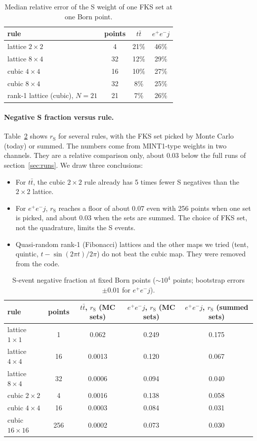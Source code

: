\documentclass[11pt,a4paper]{article}
\newcommand{\rS}{r_{\mathrm S}}
\begin{document}
\begin{table}[t]
\centering
\begin{tabular}{lccc}
\toprule
rule & points & $t\bar t$ & $e^+e^-j$\\
\midrule
lattice $2\times2$ & 4  & 21\% & 46\% \\
lattice $8\times4$ & 32 & 12\% & 29\% \\
cubic $4\times4$   & 16 & 10\% & 27\% \\
cubic $8\times4$   & 32 & 8\%  & 25\% \\
rank-1 lattice (cubic), $N=21$ & 21 & 7\% & 26\% \\
\bottomrule
\end{tabular}
\caption{Median relative error of the S weight of one FKS set at one Born point.}
\label{tab:fixedset}
\end{table}

\paragraph{Negative S fraction versus rule.}
Table~\ref{tab:dumpr} shows $\rS$ for several rules, with the FKS set picked by Monte Carlo
(today) or summed. The numbers come from MINT1-type weights in two channels. They
are a relative comparison only, about $0.03$ below the full runs of
section~\ref{sec:runs}. We draw three conclusions:
\begin{itemize}
\item For $t\bar t$, the cubic $2\times2$ rule already has 5 times fewer S negatives than the
$2\times2$ lattice.
\item For $e^+e^-j$, $\rS$ reaches a floor of about $0.07$ even with 256 points when one set
is picked, and about $0.03$ when the sets are summed. The choice of FKS set, not the
quadrature, limits the S events.
\item Quasi-random rank-1 (Fibonacci) lattices and the other maps we tried (tent, quintic,
$t-\sin(2\pi t)/2\pi$) do not beat the cubic map. They were removed from the code.
\end{itemize}

\begin{table}[t]
\centering
\begin{tabular}{lcccc}
\toprule
rule & points & $t\bar t$, $\rS$ (MC sets) & $e^+e^-j$, $\rS$ (MC sets) & $e^+e^-j$, $\rS$ (summed sets)\\
\midrule
lattice $1\times1$ & 1 & 0.062 & 0.249 & 0.175 \\
lattice $4\times4$ & 16 & 0.0013 & 0.120 & 0.067 \\
lattice $8\times4$ & 32 & 0.0006 & 0.094 & 0.040 \\
cubic $2\times2$ & 4 & 0.0016 & 0.138 & 0.058 \\
cubic $4\times4$ & 16 & 0.0003 & 0.084 & 0.031 \\
cubic $16\times16$ & 256 & 0.0002 & 0.073 & 0.030 \\
\bottomrule
\end{tabular}
\caption{S-event negative fraction at fixed Born points ($\sim10^4$ points; bootstrap errors
$\pm0.01$ for $e^+e^-j$).}
\label{tab:dumpr}
\end{table}
\end{document}
